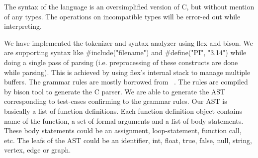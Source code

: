  The syntax of the language is an oversimplified version  of C, but
    without mention of any types. The operations on incompatible types
    will be error-ed out while interpreting.

    We have implemented the tokenizer and syntax analyzer using flex and 
    bison. We are supporting syntax like \#include("filename") and 
    \#define("PI", "3.14") while doing a single pass of parsing  (i.e.  
        preprocessing of these constructs are done while parsing). This is 
    achieved by using flex's internal stack to manage multiple buffers.
    The grammar rules are mostly borrowed from 
    ~\cite{ANSI}. The rules are compiled 
    by bison tool to generate the C parser. 
    We are able to generate the AST corresponding to test-cases 
    confirming to the grammar rules. Our AST is basically a list of function 
    definitions. Each function definition object contains name of the function, 
    a set of formal arguments and a list of body statements. These body 
    statements could be an assignment, loop-statement, function call, etc.
    The leafs of the AST could be an identifier, int, float, true, false, null, 
    string, vertex, edge or graph.

